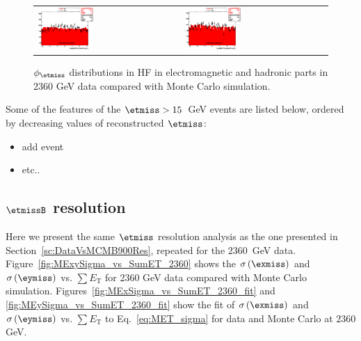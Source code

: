 \begin{figure}[h!]
 \centering
 \begin{tabular}{ll}
  \includegraphics[width=0.40\textwidth]{plots_DataVsMC_MB_2360GeV/my_calometEmHFPhi_lin.eps} &
  \includegraphics[width=0.40\textwidth]{plots_DataVsMC_MB_2360GeV/my_calometHadHFPhi_lin.eps} \\
 \end{tabular}
 \caption{$\phi_{\etmiss}$ distributions in HF in electromagnetic and hadronic parts in 2360 GeV data compared
   with Monte Carlo simulation.
          \label{fig:DataVsMC_MB_2360_14}}
\end{figure}

\clearpage

Some of the features of the $\etmiss>15$~GeV events are listed below,
ordered by decreasing values of reconstructed $\etmiss$:
\begin{itemize}
\item add event
\item etc..
\end{itemize}

\subsection[$\etmiss$ resolution]{$\etmissB$ resolution}

Here we present the same $\etmiss$ resolution analysis as the one presented in Section~\ref{sc:DataVsMCMB900Res}, repeated for the $2360$~GeV data. 
Figure~\ref{fig:MExySigma_vs_SumET_2360} shows the $\sigma\left(\exmiss\right)$ and $\sigma\left(\eymiss\right)$ 
vs. $\sum E_\text{T}$ for 2360 GeV data compared with Monte Carlo simulation. Figures~\ref{fig:MExSigma_vs_SumET_2360_fit} 
and \ref{fig:MEySigma_vs_SumET_2360_fit} show the fit of $\sigma\left(\exmiss\right)$ and $\sigma\left(\eymiss\right)$ vs. 
$\sum E_\text{T}$ to Eq.~\ref{eq:MET_sigma} for data and  Monte Carlo at $2360$ GeV.

